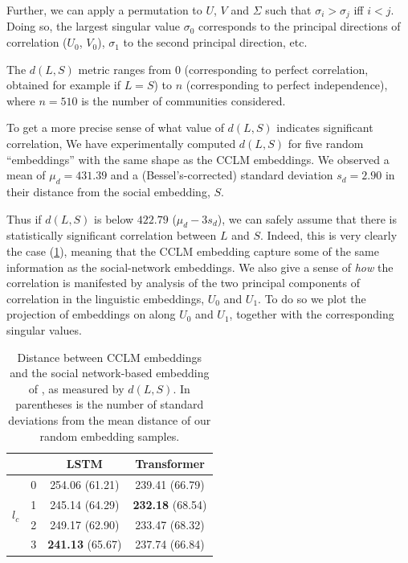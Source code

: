 \documentclass[11pt]{article}
\newcommand\jp[1]{\todo[backgroundcolor=blue!10]{JP: #1}}
\begin{document}
Further, we can apply a permutation to \(U\), \(V\) and \(Σ\) such
that \(σ_i > σ_j\) iff \(i < j\). Doing so, the largest singular value
\(σ_0\) corresponds to the principal directions of correlation
(\(U_0\), \(V_0\)), \(σ_1\) to the second principal direction, etc.

The \(d(L,S)\) metric ranges from \(0\) 
(corresponding to perfect correlation, 
obtained for example if \(L=S\)) 
to \(n\) 
(corresponding to perfect independence), 
where $n=510$ is the number of communities considered.

To get a more precise sense of what value of \(d(L,S)\) indicates significant correlation,
We have experimentally computed \(d(L,S)\) for five random  ``embeddings'' 
with the same shape as the CCLM embeddings.
We observed a mean of \(μ_d=431.39\) and a (Bessel's-corrected) 
standard deviation \(s_d=2.90\) in their distance from the social embedding, \(S\). %


Thus if \(d(L,S)\) is below \(422.79\)
($\mu_d - 3s_d$), 
we can safely assume that there 
is statistically significant correlation between \(L\) and
\(S\). 
Indeed, this is very clearly the case (\cref{tab:embedding-correlations}),
meaning that the CCLM embedding capture some of the same information as the
social-network embeddings.
We also give a sense of \emph{how} the
correlation is manifested by analysis of the two principal components
of correlation in the linguistic embeddings, \(U_0\) and \(U_1\). To
do so we plot the projection of embeddings on along \(U_0\) and
\(U_1\), together with the corresponding singular values.

\begin{table}
\centering
\begin{tabular}{llcc}
\toprule
                        &   & LSTM     & Transformer \\
\midrule
  \multirow{4}{*}{$l_c$}  & 0 &         254.06  (61.21) &         239.41  (66.79)  \\
                          & 1 &         245.14  (64.29) & \textbf{232.18} (68.54)   \\
                          & 2 &         249.17  (62.90) &         233.47  (68.32)  \\
                          & 3 & \textbf{241.13} (65.67) &         237.74   (66.84) \\
\bottomrule
\end{tabular}
\caption{Distance between CCLM embeddings and the social network-based embedding
of \citet{Kumar2018}, as measured by $d(L,S)$. In parentheses is the number of standard deviations
from the mean distance of our random embedding samples.} \label{tab:embedding-correlations}
\end{table}
\end{document}
